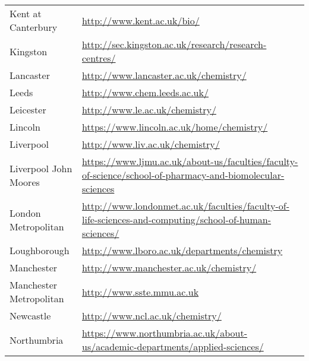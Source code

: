 \begin{tabular}{||l|l}
 Kent at Canterbury                 & \url{http://www.kent.ac.uk/bio/}                                                                                                           \\
 Kingston                           & \url{http://sec.kingston.ac.uk/research/research-centres/}                                                                                 \\
 Lancaster                          & \url{http://www.lancaster.ac.uk/chemistry/}                                                                                                \\
 Leeds                              & \url{http://www.chem.leeds.ac.uk/}                                                                                                         \\
 Leicester                          & \url{http://www.le.ac.uk/chemistry/}                                                                                                       \\
 Lincoln                            & \url{https://www.lincoln.ac.uk/home/chemistry/}                                                                                            \\
 Liverpool                          & \url{http://www.liv.ac.uk/chemistry/}                                                                                                      \\
 Liverpool John Moores              & \url{https://www.ljmu.ac.uk/about-us/faculties/faculty-of-science/school-of-pharmacy-and-biomolecular-sciences}                            \\
 London Metropolitan                & \url{http://www.londonmet.ac.uk/faculties/faculty-of-life-sciences-and-computing/school-of-human-sciences/}                                \\
 Loughborough                       & \url{http://www.lboro.ac.uk/departments/chemistry}                                                                                         \\
 Manchester                         & \url{http://www.manchester.ac.uk/chemistry/}                                                                                               \\
 Manchester Metropolitan            & \url{http://www.sste.mmu.ac.uk}                                                                                                            \\
 Newcastle                          & \url{http://www.ncl.ac.uk/chemistry/}                                                                                                      \\
 Northumbria                        & \url{https://www.northumbria.ac.uk/about-us/academic-departments/applied-sciences/}                                                        
 \end{tabular}
 
